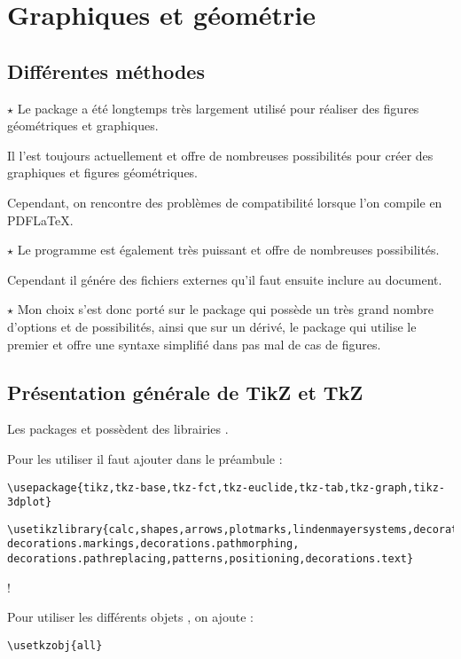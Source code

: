 \chapter{Graphiques et géométrie}\label{graph}

\section{Différentes méthodes }

$\star$ Le package  a été longtemps très largement utilisé pour réaliser des figures géométriques et graphiques.

Il l'est toujours actuellement et offre de nombreuses possibilités pour créer des graphiques et figures géométriques.

Cependant, on rencontre des problèmes de compatibilité lorsque l'on compile en PDF\LaTeX{}.

$\star$ Le programme  est également très puissant et offre de nombreuses possibilités. 

Cependant il génére des fichiers externes qu'il faut ensuite inclure au document.

$\star$ Mon choix s'est donc porté sur le package  qui possède un très grand nombre d'options et de possibilités, ainsi que sur un dérivé, le package  qui utilise le premier et offre une syntaxe simplifié dans pas mal de cas de figures.

\section{Présentation générale de TikZ et TkZ}

Les packages  et  possèdent des librairies . 

Pour les utiliser il faut ajouter dans le préambule :

\verb!\usepackage{tikz,tkz-base,tkz-fct,tkz-euclide,tkz-tab,tkz-graph,tikz-3dplot}!

\begin{verbatim}
\usetikzlibrary{calc,shapes,arrows,plotmarks,lindenmayersystems,decorations,
decorations.markings,decorations.pathmorphing,
decorations.pathreplacing,patterns,positioning,decorations.text}
\end{verbatim}!

Pour utiliser les différents objets , on ajoute :

\verb!\usetkzobj{all}!

